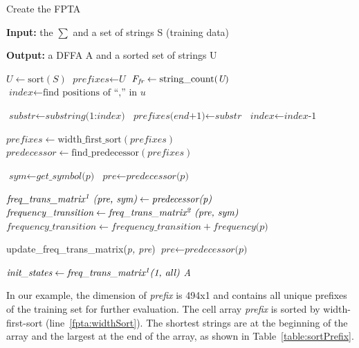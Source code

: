 \documentclass[
a4paper,
12pt
]{scrartcl}
\begin{document}
\begin{algorithm}[]
\caption{Create the FPTA}\label{alg:fpta}
\begin{algorithmic}[1]
\item \textbf{Input:} the $\sum$ and a set of strings S (training data)
\item \textbf{Output:} a DFFA A and a sorted set of strings U

\State $\textit{U} \gets \text{sort}(\textit{S})$ \label{fpta:sort}
\State $\textit{prefixes} \gets \textit{U}$
\State $\textit{F\textsubscript{fr}} \gets \text{string\_count}(\textit{U})$
 \label{fpta:BeginForPrefix}
        \State $\textit{index} \gets \text{find positions of ``,'' in }\textit{u}$

          \State $\textit{substr} \gets \textit{substring(1:index)}$
   	 \State $\textit{prefixes(end+1)} \gets \textit{substr}$
        \EndIf
           \State $\textit{index} \gets \textit{index-1}$
       \EndWhile
\EndFor \label{fpta:EndForPrefix}

\State $\textit{prefixes} \gets \text{width\_first\_sort}(\textit{prefixes})$ \label{fpta:widthSort}
\State $\textit{predecessor} \gets \text{find\_predecessor}(\textit{prefixes})$ \label{fpta:findPredecessor}

 \label{fpta:BeginForFreq}
\State $\textit{sym} \gets \textit{get\_symbol(p)}$
\State $\textit{pre} \gets \textit{predecessor(p)}$

\State $\textit{freq\_trans\_matrix\textsuperscript{1} (pre, sym)} \gets \textit{predecessor(p)}$
\State $\textit{frequency\_transition} \gets \textit{freq\_trans\_matrix\textsuperscript{2} (pre, sym)} $
\State $\textit{frequency\_transition} \gets \textit{frequency\_transition} + \textit{frequency(p)}$

          \State update\_freq\_trans\_matrix(\textit{p, pre})
          \State $\textit{pre} \gets \textit{predecessor(p)}$
   \EndWhile

\EndFor \label{fpta:EndForFreq}

\State $\textit{init\_states} \gets  \textit{freq\_trans\_matrix\textsuperscript{1}(1, all)}$
\State \Return \textit{A}  \label{fpta:return}
\end{algorithmic}
\end{algorithm}

In our example, the dimension of  \emph{prefix} is 494x1 and contains all unique prefixes of the training set for further evaluation.
The cell array \emph{prefix} is sorted by width-first-sort (line~\ref{fpta:widthSort}). The shortest strings are at the beginning of the array and the largest at the end of the array, as shown in Table~\ref{table:sortPrefix}.
\end{document}
